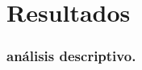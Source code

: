 \documentclass[
  spanish,
  a4paper,
  oneside]{scrbook}
\begin{document}

\chapter{Resultados}\label{resultados}

\subsection{análisis descriptivo.}\label{anuxe1lisis-descriptivo.}

\begin{table}

\caption{\label{tbl-descriptivos}Tabla 1. Estadísticos descriptivos (N=
1176)}

\centering{

}

\end{table}%
\end{document}
